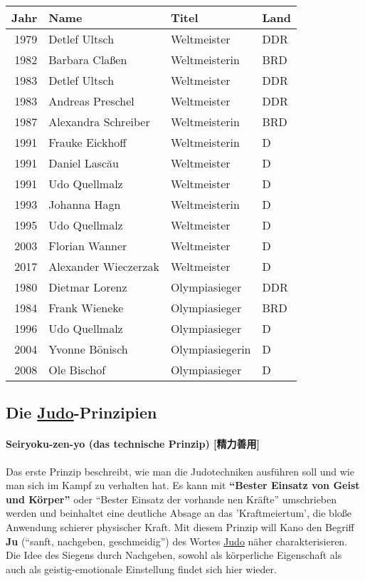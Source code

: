 \documentclass[justified, a4paper, notitlepage, captions=tableheading, nobib]{tufte-handout}
\begin{document}
\begin{center}
\begin{tabular}{rlll}
\hline
Jahr & Name & Titel & Land\\
\hline
1979 & Detlef Ultsch & Weltmeister & DDR\\
1982 & Barbara Claßen & Weltmeisterin & BRD\\
1983 & Detlef Ultsch & Weltmeister & DDR\\
1983 & Andreas Preschel & Weltmeister & DDR\\
1987 & Alexandra Schreiber & Weltmeisterin & BRD\\
1991 & Frauke Eickhoff & Weltmeisterin & D\\
1991 & Daniel Lascău & Weltmeister & D\\
1991 & Udo Quellmalz & Weltmeister & D\\
1993 & Johanna Hagn & Weltmeisterin & D\\
1995 & Udo Quellmalz & Weltmeister & D\\
2003 & Florian Wanner & Weltmeister & D\\
2017 & Alexander Wieczerzak & Weltmeister & D\\
\hline
1980 & Dietmar Lorenz & Olympiasieger & DDR\\
1984 & Frank Wieneke & Olympiasieger & BRD\\
1996 & Udo Quellmalz & Olympiasieger & D\\
2004 & Yvonne Bönisch & Olympiasiegerin & D\\
2008 & Ole Bischof & Olympiasieger & D\\
\hline
\end{tabular}
\end{center}

\subsection{Die \hyperref[org80c3996]{Judo}-Prinzipien}
\label{sec:org369eeb4}
\paragraph{\label{orgd0a8e14}Seiryoku-zen-yo (das technische Prinzip) [精力善用]}
\label{sec:org1b3e2c1}
Das erste Prinzip beschreibt, wie man die Judotechniken ausführen soll und wie man sich im Kampf zu verhalten hat. Es kann mit \textbf{"`Bester Einsatz von Geist und Körper"'} oder "`Bester Einsatz der vorhande
nen Kräfte"' umschrieben werden und beinhaltet eine deutliche Absage an das 'Kraftmeiertum', die bloße Anwendung schierer physischer Kraft. Mit diesem Prinzip will Kano den Begriff \textbf{Ju} ("`sanft, nachgeben, geschmeidig"') des Wortes \hyperref[org80c3996]{Judo} näher charakterisieren. Die Idee des Siegens durch Nachgeben, sowohl als körperliche Eigenschaft als auch als geistig-emotionale Einstellung findet sich hier wieder. 
\end{document}
